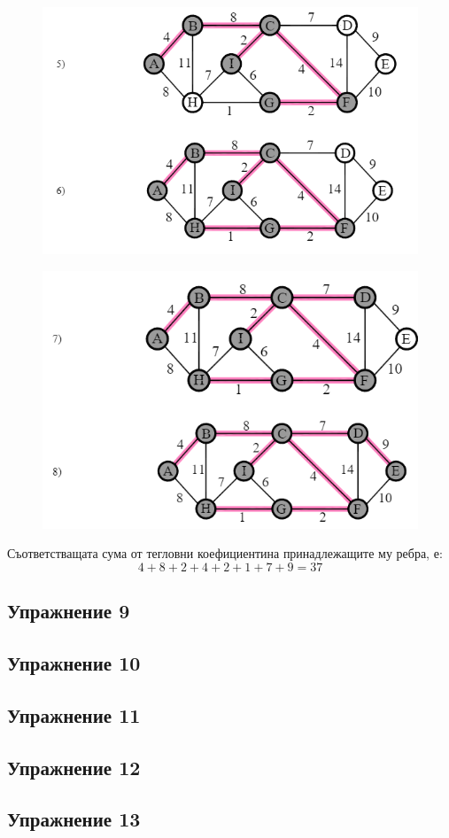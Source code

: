 \documentclass[fleqn, 12pt]{article}
\theoremstyle{definition}
\begin{document}
\begin{figure} [htp!]
\includegraphics{Pics/Discrete math/ex8/ex8-task8-3.png}
\end{figure}
\begin{figure} [htp!]
\includegraphics{Pics/Discrete math/ex8/ex8-task8-4.png}
\end{figure}
Съответстващата сума от тегловни коефициентина принадлежащите му ребра, е:
$$ 4 + 8 + 2 + 4 + 2 + 1 + 7 + 9 = 37$$
\newpage
\subsection{Упражнение 9}

\newpage
\subsection{ Упражнение 10}

\newpage
\subsection{ Упражнение 11}

\newpage
\subsection{ Упражнение 12}

\newpage
\subsection{ Упражнение 13}
\end{document}
